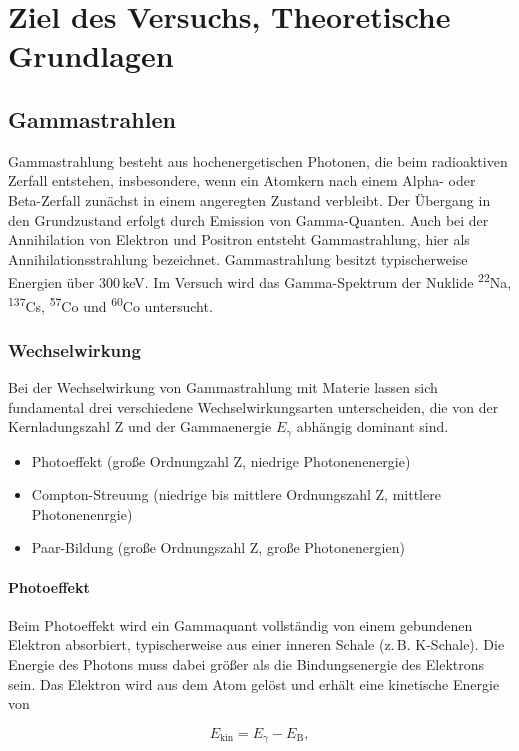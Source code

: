 \chapter{Ziel des Versuchs, Theoretische Grundlagen}
\section{Gammastrahlen}

Gammastrahlung besteht aus hochenergetischen Photonen, die beim radioaktiven Zerfall entstehen, insbesondere, wenn ein Atomkern nach einem Alpha- oder Beta-Zerfall zunächst in einem angeregten Zustand verbleibt. Der Übergang in den Grundzustand erfolgt durch Emission von Gamma-Quanten. Auch bei der Annihilation von Elektron und Positron entsteht Gammastrahlung, hier als Annihilationsstrahlung bezeichnet. Gammastrahlung besitzt typischerweise Energien über 300\,keV. Im Versuch wird das Gamma-Spektrum der Nuklide \textsuperscript{22}Na, \textsuperscript{137}Cs, \textsuperscript{57}Co und \textsuperscript{60}Co untersucht.

\subsection{Wechselwirkung}
Bei der Wechselwirkung von Gammastrahlung mit Materie lassen sich fundamental drei verschiedene Wechselwirkungsarten unterscheiden, die von der Kernladungszahl Z und der Gammaenergie $E_{\gamma}$ abhängig dominant sind.
\begin{itemize}
    \item Photoeffekt (große Ordnungzahl Z, niedrige Photonenenergie)
    \item Compton-Streuung (niedrige bis mittlere Ordnungszahl Z, mittlere Photonenenrgie)
    \item Paar-Bildung (große Ordnungszahl Z, große Photonenergien)
\end{itemize}
\subsubsection{Photoeffekt}

Beim Photoeffekt wird ein Gammaquant vollständig von einem gebundenen Elektron absorbiert, typischerweise aus einer inneren Schale (z.\,B. K-Schale). Die Energie des Photons muss dabei größer als die Bindungsenergie des Elektrons sein. Das Elektron wird aus dem Atom gelöst und erhält eine kinetische Energie von

\[
E_\text{kin} = E_\gamma - E_\text{B},
\]

